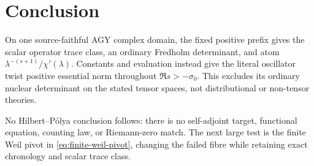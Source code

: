 \section{Conclusion}
\label{sec:conclusion}

On one source-faithful AGY complex domain, the fixed positive prefix gives
the scalar operator trace class, an ordinary Fredholm determinant, and atom
\(\lambda^{-(s+1)}/\chi'(\lambda)\).  Constants and evaluation instead give
the literal oscillator twist positive essential norm throughout
\(\Re s> -\sigma_0\).  This excludes its ordinary nuclear determinant on the
stated tensor spaces, not distributional or non-tensor theories.

No Hilbert--P\'olya conclusion follows: there is no self-adjoint target,
functional equation, counting law, or Riemann-zero match.  The next large
test is the finite Weil pivot in \eqref{eq:finite-weil-pivot}, changing the
failed fibre while retaining exact chronology and scalar trace class.
